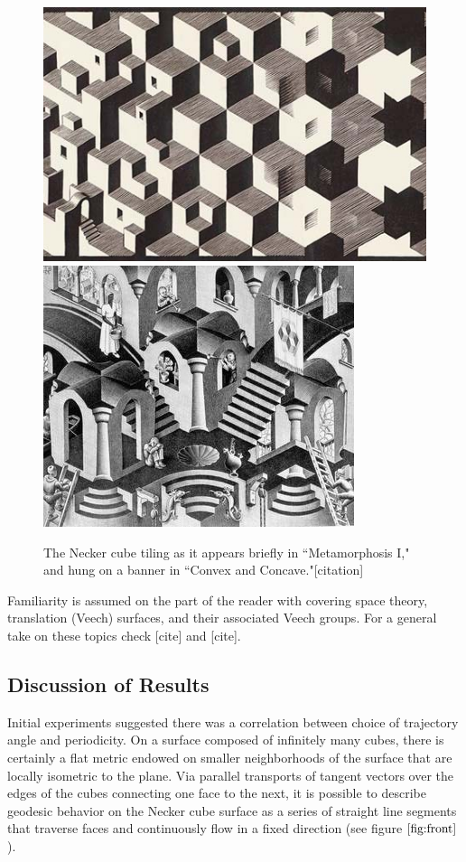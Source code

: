 \documentclass[]{article}
\begin{document}
\begin{figure}[H]
\begin{center}
\includegraphics[scale=0.4]{escher.jpg}
\includegraphics[scale=0.55]{escher2.jpg}
\caption{The Necker cube tiling as it appears briefly in ``Metamorphosis I," and hung on a banner in ``Convex and Concave."[citation]}
\label{fig:Escher}
\end{center}
\end{figure}


\begin{rem}
Familiarity is assumed on the part of the reader with covering space theory, translation (Veech) surfaces, and their associated Veech groups. For a general take on these topics check [cite] and [cite].
\end{rem}

\subsection{Discussion of Results}
Initial experiments suggested there was a correlation between choice of trajectory angle and periodicity. On a surface composed of infinitely many cubes, there is certainly a flat metric endowed on smaller neighborhoods of the surface that are locally isometric to the plane. Via parallel transports of tangent vectors over the edges of the cubes connecting one face to the next, it is possible to describe geodesic behavior on the Necker cube surface as a series of straight line segments that traverse faces and continuously flow in a fixed direction (see figure $\ref{fig:front}$).
\\\\
\end{document}
